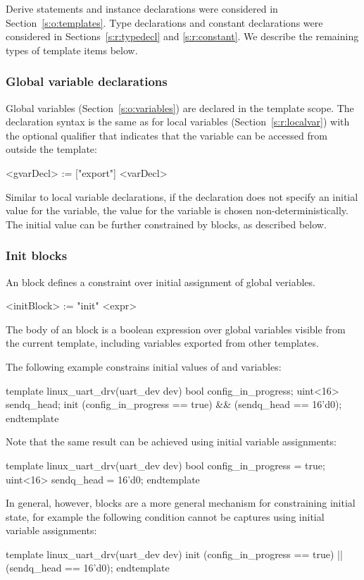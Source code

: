 Derive statements and instance declarations were considered in 
Section~\ref{s:o:templates}.  Type declarations and constant 
declarations were considered in Sections~\ref{s:r:typedecl} and
\ref{s:r:constant}.  We describe the remaining types of template 
items below.

\subsubsection{Global variable declarations}

Global variables (Section~\ref{s:o:variables}) are declared in the 
template scope.  The declaration syntax is the same as for local 
variables (Section~\ref{s:r:localvar}) with the optional 
 qualifier that indicates that the variable can be 
accessed from outside the template:

\begin{bnflisting}
<gvarDecl> := ["export"] <varDecl>
\end{bnflisting}

Similar to local variable declarations, if the declaration does 
not specify an initial value for the variable, the value for the 
variable is chosen non-deterministically.  The initial value can 
be further constrained by  blocks, as described below.

\subsubsection{Init blocks}

An  block defines a constraint over initial assignment 
of global veriables.
\begin{bnflisting}
<initBlock> := "init" <expr>
\end{bnflisting}
The body of an  block is a boolean expression over 
global variables visible from the current template, including 
variables exported from other templates.  

The following example constrains initial values of 
 and  variables:
\begin{tsllisting2}
template linux_uart_drv(uart_dev dev)
    bool config_in_progress;
    uint<16> sendq_head;
    init (config_in_progress == true) &&
         (sendq_head == 16'd0);
endtemplate
\end{tsllisting2}
Note that the same result can be achieved using initial variable 
assignments:
\begin{tsllisting2}
template linux_uart_drv(uart_dev dev)
    bool config_in_progress = true;
    uint<16> sendq_head = 16'd0;
endtemplate
\end{tsllisting2}
In general, however,  blocks are a more general 
mechanism for constraining initial state, for example the 
following condition cannot be captures using initial variable 
assignments:
\begin{tsllisting2}
template linux_uart_drv(uart_dev dev)
    init (config_in_progress == true) ||
         (sendq_head == 16'd0);
endtemplate
\end{tsllisting2}

